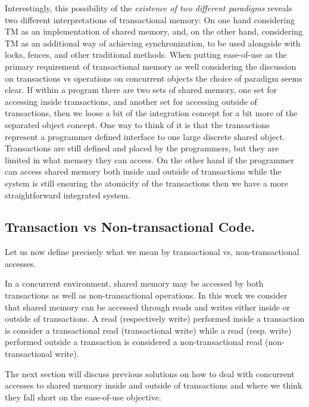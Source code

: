 Interestingly, this possibility of the {\it existence of two different paradigms} reveals
two different interpretations of transactional memory: On one hand considering TM as an implementation
of shared memory, and, on the other hand, considering TM as an additional way of achieving synchronization, 
to be used alongside with locks, fences, and other traditional methods.
When putting ease-of-use as the primary requirement of transactional memory
as well considering the discussion on transactions vs operations on concurrent objects
the choice of paradigm seems clear.
If within a program there are two sets of shared memory, one set for accessing inside
transactions, and another set for accessing outside of transactions, then we loose a
bit of the integration concept for a bit more of the separated object concept.
One way to think of it is that the transactions represent a programmer defined
interface to one large discrete shared object.
Transactions are still defined and placed by the programmers, but they are limited
in what memory they can access.
On the other hand if the programmer can access shared memory both inside and outside
of transactions while the system is still ensuring the atomicity of the transactions then
we have a more straightforward integrated system.

\subsection{Transaction vs Non-transactional Code.}
\label{sec:TvNT}
Let us now define precisely what we mean by transactional vs, non-transactional
accesses.

In a  concurrent environment,  shared memory  may  be
accessed by both transactions as well as  
non-transactional operations. %
In this work we consider that shared memory can be accessed through
reads and writes either inside or outside of transactions.
A read (respectively write) performed inside a transaction is consider
a transactional read (transactional write) while a read (resp. write)
performed outside a transaction is considered a non-transactional read
(non-transactional write).

The next section will discuss previous solutions on how to deal
with concurrent accesses to shared memory inside and outside of transactions
and where we think they fall short on the ease-of-use objective.

